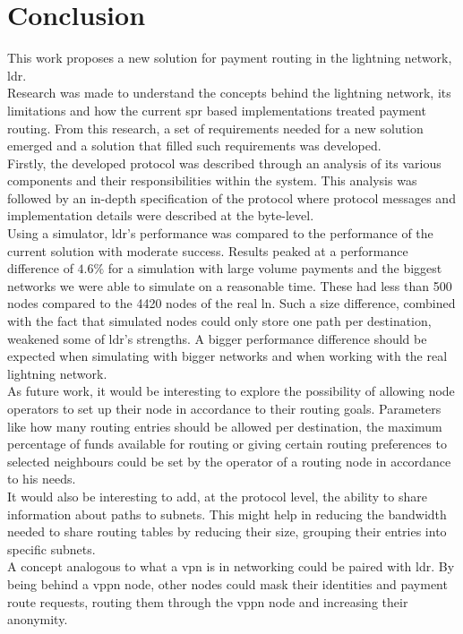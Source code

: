 \section{Conclusion}

This work proposes a new solution for payment routing in the lightning network, \acrfull{ldr}.\\
Research was made to understand the concepts behind the lightning network, its limitations and how the current \acrfull{spr} based implementations treated payment routing. From this research, a set of requirements needed for a new solution emerged and a solution that filled such requirements was developed.\\
Firstly, the developed protocol was described through an analysis of its various components and their responsibilities within the system. This analysis was followed by an in-depth specification of the protocol where protocol messages and implementation details were described at the byte-level.\\
Using a simulator, \acrshort{ldr}'s performance was compared to the performance of the current solution with moderate success. Results peaked at a performance difference of $4.6\%$ for a simulation with large volume payments and the biggest networks we were able to simulate on a reasonable time. These had less than 500 nodes compared to the 4420 nodes of the real \acrshort{ln}. Such a size difference, combined with the fact that simulated nodes could only store one path per destination, weakened some of \acrshort{ldr}'s strengths. A bigger performance difference should be expected when simulating with bigger networks and when working with the real lightning network.\\
As future work, it would be interesting to explore the possibility of allowing node operators to set up their node in accordance to their routing goals. Parameters like how many routing entries should be allowed per destination, the maximum percentage of funds available for routing or giving certain routing preferences to selected neighbours could be set by the operator of a routing node in accordance to his needs.\\
It would also be interesting to add, at the protocol level, the ability to share information about paths to subnets. This might help in reducing the bandwidth needed to share routing tables by reducing their size, grouping their entries into specific subnets.\\
A concept analogous to what a \acrfull{vpn} is in networking could be paired with \acrshort{ldr}. By being behind a \acrfull{vppn} node, other nodes could mask their identities and payment route requests, routing them through the \acrshort{vppn} node and increasing their anonymity.\\